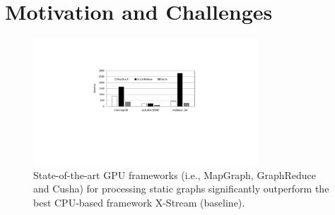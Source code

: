 \section{Motivation and Challenges}
\begin{figure}[!t]
\centering
\includegraphics[width=0.75\textwidth,height=0.75\textheight,keepaspectratio]{figures/static_GR.pdf}
\caption{State-of-the-art GPU frameworks (i.e., MapGraph, GraphReduce and Cusha) for processing static graphs significantly outperform the best CPU-based framework X-Stream (baseline).}
\label{fig:static}
\end{figure}





